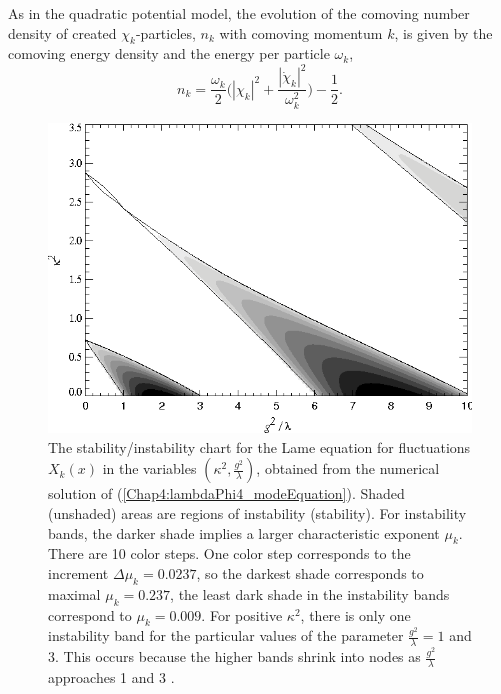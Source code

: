 \documentclass[11pt,a4paper,twoside]{book}
\begin{document}
As in the quadratic potential model, the evolution of the comoving number density of created $\chi_{k}$-particles, $ n_{k} $ with comoving momentum $ k $, is given by the comoving energy density and the energy per particle $\omega_{k}$,
\begin{equation}
\label{Chap4:lambdaPhi4Model}
n_{k}=\frac{\omega_{k}}{2}\Bigg(|\chi_{k}|^{2} + \frac{|\dot{\chi}_{k}|^{2}}{\omega_{k}^{2}}\Bigg) - \frac{1}{2}.
\end{equation}
\begin{figure}
	\centering
	\includegraphics[width=0.6\linewidth, height=0.3\textheight]{Images/Chap4/ConformalTheory_Fig4}
	\caption{The stability/instability chart for the Lame equation for fluctuations $ X_{k}(x) $ in the variables $ (\kappa^{2},\frac{g^{2}}{\lambda}) $, obtained from the numerical solution of (\ref{Chap4:lambdaPhi4_modeEquation}). Shaded (unshaded) areas are regions of instability (stability). For instability bands, the darker shade implies a larger characteristic exponent $\mu_{k}$. There are 10 color steps. One color step corresponds to the increment $\Delta \mu_{k} = 0.0237$, so the darkest shade corresponds to maximal $\mu_{k}=0.237$, the least dark shade in the instability bands correspond to $\mu_{k}=0.009$. For positive $\kappa^{2}$, there is only one instability band for the particular values of the parameter $ \frac{g^{2}}{\lambda}=1 $ and 3. This occurs because the higher bands shrink into nodes as $ \frac{g^{2}}{\lambda} $ approaches 1 and 3 \cite{Chap4:ModelLambdaPhi4Reference}.  }
	\label{fig:conformaltheoryfig4}
\end{figure}
\end{document}
